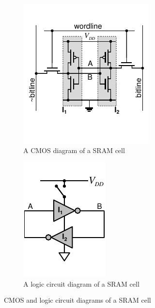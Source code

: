 \begin{figure}[h!]
    \centering
    \captionsetup{justification=centering,margin=0.5cm}
    \begin{subfigure}[c]{0.5\textwidth}
        \centering
        \includegraphics[width=0.85\linewidth]{images/transistor_sram_cell.pdf}
        \caption{A CMOS diagram of a SRAM cell}
        \label{fig:sram_cell_cmos}
    \end{subfigure}%
    \begin{subfigure}[c]{0.5\textwidth}
        \centering
        \includegraphics[width=0.6728\linewidth]{images/logic_sram_cell.pdf}
        \caption{A logic circuit diagram of a SRAM cell}
        \label{fig:sram_cell_logic}
    \end{subfigure}
    \caption[CMOS and logic circuit diagrams of a SRAM cell]{CMOS and logic circuit diagrams of a SRAM cell~\cite{Maes2012}}
    \label{fig:sram_cell}
\end{figure}

